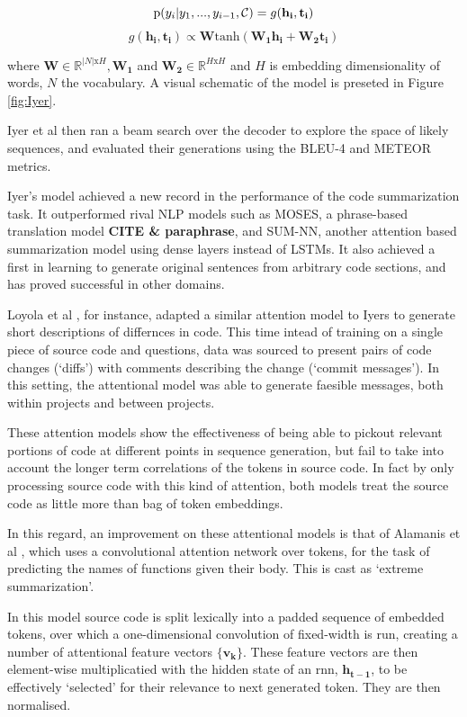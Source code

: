 $$\text p(y_i | y_1, ..., y_{i-1},\mathcal{C} ) = g(\mathbf{h_i}, \mathbf{t_i}) $$
$$g(\mathbf{h_i}, \mathbf{t_i})  \propto \mathbf{W}\text{tanh}(\mathbf{W_1h_i} + \mathbf{W_2t_i})$$

where $\mathbf{W} \in \mathbb{R}^{|N|\text{x} H}, \mathbf{W_1}$ and $\mathbf{W_2} \in \mathbb{R}^{H \text{x} H}$  and $ H$ is embedding dimensionality of words, $ N $ the vocabulary.\cite{iyer_summarizing_2016}
A visual schematic of the model is preseted in Figure \ref{fig:Iyer}.

Iyer et al then ran a beam search over the decoder to explore the space of likely sequences, and evaluated their generations using the BLEU-4 and METEOR metrics.

Iyer's model achieved a new record in the performance of the code summarization task. 
It outperformed rival NLP models such as MOSES, a phrase-based translation model \textbf{CITE \& paraphrase}, and SUM-NN, another attention based summarization model using dense layers instead of LSTMs. 
It also achieved a first in learning to generate original sentences from arbitrary code sections, and has proved successful in other domains.  

Loyola et al \cite{loyola_neural_2017}, for instance, adapted a similar attention model to Iyers to generate short descriptions of differnces in code.
This time intead of training on a single piece of source code and questions, data was sourced to present pairs of code changes (`diffs') with comments describing the change (`commit messages'). 
In this setting, the attentional model was able to generate faesible messages, both within projects and between projects.

These attention models show the effectiveness of being able to pickout relevant portions of code at different points in sequence generation, but fail to take into account the longer term correlations of the tokens in source code. In fact by only processing source code with this kind of attention, both models treat the source code as little more than bag of token embeddings.

In this regard, an improvement on these attentional models is that of Alamanis et al \cite{allamanis_convolutional_2016}, which uses a convolutional attention network over tokens, for the task of predicting the names of functions given their body. This is cast as `extreme summarization'.

In this model source code is split lexically into a padded sequence of embedded tokens, over which a one-dimensional convolution of fixed-width is run, creating a number of attentional feature vectors $\mathbf{\{v_k\}}$.
These feature vectors are then element-wise multiplicatied with the hidden state of an rnn, $\mathbf{h_{t-1}}$, to be effectively `selected' for their relevance to next generated token. They are then normalised.


